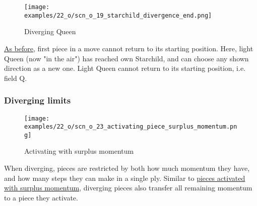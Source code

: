 \vspace*{-0.9\baselineskip}
\noindent
\begin{figure}[!h]
\texttt{[image: examples/22\_o/scn\_o\_19\_starchild\_divergence\_end.png]}
\vspace*{-1.4\baselineskip}
\caption{Diverging Queen}
\label{fig:scn_o_19_starchild_divergence_end}
\end{figure}

\vspace*{-0.5\baselineskip}
\hyperref[fig:scn_cot_36_diverging_first_piece]{As before}, first piece in a move
cannot return to its starting position. Here, light Queen (now "in the air") has
reached own Starchild, and can choose any shown direction as a new one. Light Queen
cannot return to its starting position, i.e. field Q.

\clearpage %

\subsubsection*{Diverging limits}
\label{sec:One/Starchild/Divergence/Diverging limits}

\vspace*{-0.9\baselineskip}
\noindent
\begin{wrapfigure}[9]{l}{0.4\textwidth}
\centering
\texttt{[image: examples/22\_o/scn\_o\_23\_activating\_piece\_surplus\_momentum.png]}
\vspace*{-0.4\baselineskip}
\caption{Activating with surplus momentum}
\label{fig:scn_o_23_activating_piece_surplus_momentum}
\end{wrapfigure}
When diverging, pieces are restricted by both how much momentum they have, and how
many steps they can make in a single ply. \newline
\indent
Similar to
\hyperref[fig:scn_mv_32_single_step_piece_momentum]{pieces activated with surplus momentum},
diverging pieces also transfer all remaining momentum to a piece they activate.


